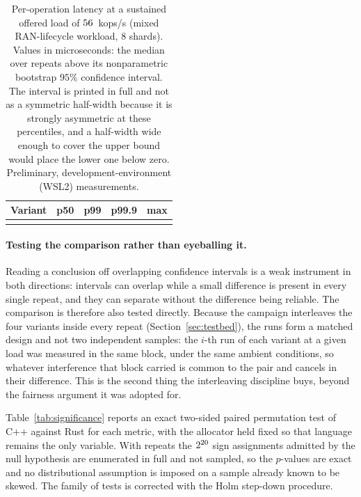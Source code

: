 \documentclass[english,twoside,openright,a4paper,censored,csm,software-track-2020]{HYthesisML}
\begin{document}
\begin{table}
\centering
\small
\caption[Per-operation latency at the representative load]{Per-operation latency at a sustained offered load of $56$~kops/s (mixed
RAN-lifecycle workload, $8$ shards). Values in microseconds: the median over \NRepeats{}
repeats above its nonparametric bootstrap $95\%$ confidence interval. The interval is printed
in full and not as a symmetric half-width because it is strongly asymmetric at these
percentiles, and a half-width wide enough to cover the upper bound would place the lower one
below zero. Preliminary, development-environment (WSL2)
measurements.\label{tab:latency}}
\begin{tabular}{@{}l r r r r@{}}
\hline\hline
Variant & p50 & p99 & p99.9 & max \\
\hline
\\
\hline
\end{tabular}
\end{table}

\paragraph{Testing the comparison rather than eyeballing it.}
Reading a conclusion off overlapping confidence intervals is a weak instrument in both
directions: intervals can overlap while a small difference is present in every single repeat,
and they can separate without the difference being reliable. The comparison is therefore also
tested directly. Because the campaign interleaves the four variants inside every repeat
(Section~\ref{sec:testbed}), the runs form a matched design and not two independent
samples: the $i$-th run of each variant at a given load was measured in the same block, under
the same ambient conditions, so whatever interference that block carried is common to the pair
and cancels in their difference. This is the second thing the interleaving discipline buys,
beyond the fairness argument it was adopted for.

Table~\ref{tab:significance} reports an exact two-sided paired permutation test of C++ against
Rust for each metric, with the allocator held fixed so that language remains the only variable.
With \NRepeats{} repeats the $2^{20}$ sign assignments admitted by the null hypothesis
are enumerated in full and not sampled, so the $p$-values are exact and no distributional
assumption is imposed on a sample already known to be skewed. The family of \NTests{} tests is
corrected with the Holm step-down procedure.
\end{document}
